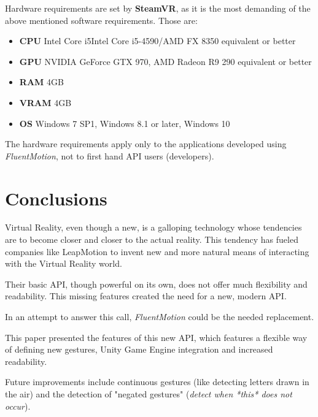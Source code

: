 \documentclass{sigchi}
\def\fluentmotion{\textit{FluentMotion}}
\def\leap{LeapMotion}
\def\vr{Virtual Reality}
\begin{document}
Hardware requirements are set by \textbf{SteamVR}, as it is the most demanding of the above mentioned software requirements. Those are:

\begin{itemize}
  \item \textbf{CPU} Intel Core i5Intel Core i5-4590/AMD FX 8350 equivalent or better
  \item \textbf{GPU} NVIDIA GeForce GTX 970, AMD Radeon R9 290 equivalent or better
  \item \textbf{RAM} 4GB
  \item \textbf{VRAM} 4GB
  \item \textbf{OS} Windows 7 SP1, Windows 8.1 or later, Windows 10
\end{itemize}

The hardware requirements apply only to the applications developed using \fluentmotion{}, not to first hand API users (developers).

\section{Conclusions}
\vr{}, even though a new, is a galloping technology whose tendencies are to become closer and closer to the actual reality. This tendency has fueled companies like \leap{} to invent new and more natural means of interacting with the \vr{} world.


Their basic API, though powerful on its own, does not offer much flexibility and readability. This missing features created the need for a new, modern API.

In an attempt to answer this call, \fluentmotion{} could be the needed replacement.

This paper presented the features of this new API, which features a flexible way of defining new gestures, Unity Game Engine integration and increased readability.

Future improvements include continuous gestures (like detecting letters drawn in the air) and the detection of "negated gestures" (\textit{detect when *this* does not occur}).

\balance{}



\end{document}
